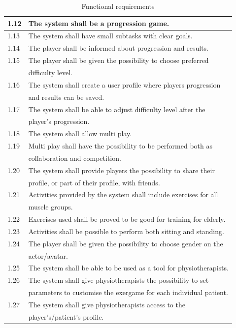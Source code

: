 \begin{table} [H]
\label{tab:func2}
\centering
\begin{tabular}{|l|l|}
\hline
1.12 & The system shall be a progression game.\\ \hline
1.13 & The system shall have small subtasks with clear goals.\\ \hline
1.14 & The player shall be informed about progression and results.\\ \hline
1.15 & The player shall be given the possibility to choose preferred \\ & difficulty level.\\ \hline
1.16 & The system shall create a user profile where players progression \\ & and results can be saved.\\ \hline
1.17 & The system shall be able to adjust difficulty level after the \\ & player's progression.\\ \hline
1.18 & The system shall allow multi play.\\ \hline
1.19 & Multi play shall have the possibility to be performed both as \\ & collaboration and competition.\\ \hline
1.20 & The system shall provide players the possibility to share their \\ & profile, or part of their profile, with friends. \\ \hline
1.21 & Activities provided by the system shall include exercises for all \\ & muscle groups.\\ \hline
1.22 & Exercises used shall be proved to be good for training for elderly.\\ \hline
1.23 & Activities shall be possible to perform both sitting and standing. \\ \hline
1.24 & The player shall be given the possibility to choose gender on the \\ &  actor/avatar. \\ \hline
1.25 & The system shall be able to be used as a tool for physiotherapists.\\ \hline
1.26 & The system shall give physiotherapists the possibility to set \\ & parameters to customise the exergame for each individual patient.\\ \hline
1.27 & The system shall give physiotherapists access to the \\ & player's/patient's profile. \\ \hline  
\end{tabular}
\caption[Functional requirements]{Functional requirements}
\end{table} 


